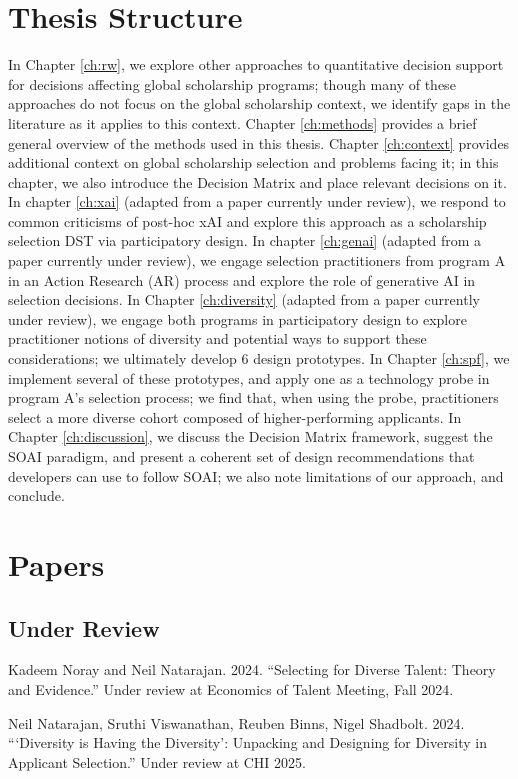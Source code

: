 \section{Thesis Structure}
In Chapter \ref{ch:rw}, we explore other approaches to quantitative decision support for decisions affecting global scholarship programs; though many of these approaches do not focus on the global scholarship context, we identify gaps in the literature as it applies to this context. Chapter \ref{ch:methods} provides a brief general overview of the methods used in this thesis. Chapter \ref{ch:context} provides additional context on global scholarship selection and problems facing it; in this chapter, we also introduce the Decision Matrix and place relevant decisions on it. In chapter \ref{ch:xai} (adapted from a paper currently under review), we respond to common criticisms of post-hoc xAI and explore this approach as a scholarship selection DST via participatory design. In chapter \ref{ch:genai} (adapted from a paper currently under review), we engage selection practitioners from program A in an Action Research (AR) process and explore the role of generative AI in selection decisions. In Chapter \ref{ch:diversity} (adapted from a paper currently under review), we engage both programs in participatory design to explore practitioner notions of diversity and potential ways to support these considerations; we ultimately develop 6 design prototypes. In Chapter \ref{ch:spf}, we implement several of these prototypes, and apply one as a technology probe in program A's selection process; we find that, when using the probe, practitioners select a more diverse cohort composed of higher-performing applicants. In Chapter \ref{ch:discussion}, we discuss the Decision Matrix framework, suggest the SOAI paradigm, and present a coherent set of design recommendations that developers can use to follow SOAI; we also note limitations of our approach, and conclude.

\section{Papers}
\subsection{Under Review}
Kadeem Noray and Neil Natarajan. 2024. “Selecting for Diverse Talent: Theory and Evidence.” Under review at Economics of Talent Meeting, Fall 2024. %

Neil Natarajan, Sruthi Viswanathan, Reuben Binns, Nigel Shadbolt. 2024. “‘Diversity is Having the Diversity’: Unpacking and Designing for Diversity in Applicant Selection.” Under review at CHI 2025. %

